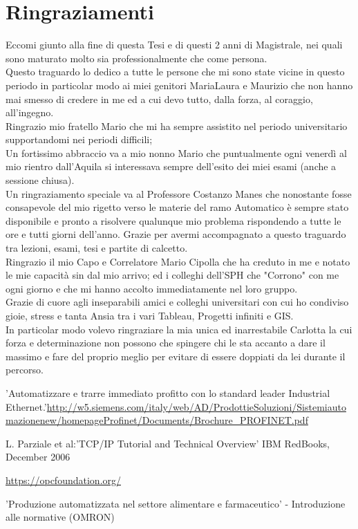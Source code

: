 \documentclass[12pt, a4paper, oneside]{book}
\begin{document}
\chapter*{Ringraziamenti}
Eccomi giunto alla fine di questa Tesi e di questi 2 anni di Magistrale, nei quali sono maturato molto sia professionalmente che come persona. 
\\Questo traguardo lo dedico a tutte le persone che mi sono state vicine in questo periodo in particolar modo ai miei genitori MariaLaura e Maurizio che non hanno mai smesso di credere in me ed a cui devo tutto, dalla forza, al coraggio, all'ingegno. 
\\Ringrazio mio fratello Mario che mi ha sempre assistito nel periodo universitario supportandomi nei periodi difficili; 
\\Un fortissimo abbraccio va a mio nonno Mario che puntualmente ogni venerdì al mio rientro dall'Aquila si interessava sempre dell'esito dei miei esami (anche a sessione chiusa).
\\Un ringraziamento speciale va al Professore Costanzo Manes che nonostante fosse consapevole del mio rigetto verso le materie del ramo Automatico è sempre stato disponibile e pronto a risolvere qualunque mio problema rispondendo a tutte le ore e tutti giorni dell'anno. Grazie per avermi accompagnato a questo traguardo tra lezioni, esami, tesi e partite di calcetto.
\\Ringrazio il mio Capo e Correlatore Mario Cipolla che ha creduto in me e notato le mie capacità sin dal mio arrivo; ed i colleghi dell'SPH che "Corrono" con me ogni giorno e che mi hanno accolto immediatamente nel loro gruppo. 
\\Grazie di cuore agli inseparabili amici e colleghi universitari con cui ho condiviso gioie, stress e tanta Ansia tra i vari Tableau, Progetti infiniti e GIS.
\\In particolar modo volevo ringraziare la mia unica ed inarrestabile Carlotta la cui forza e determinazione non possono che spingere chi le sta accanto a dare il massimo e fare del proprio meglio per evitare di essere doppiati da lei durante il percorso. 

\newpage
\begin{thebibliography}{100}
	'Automatizzare e trarre immediato profitto con lo standard leader Industrial Ethernet.'\url{http://w5.siemens.com/italy/web/AD/ProdottieSoluzioni/Sistemiautomazionenew/homepageProfinet/Documents/Brochure_PROFINET.pdf}	
	
	L. Parziale et al:'TCP/IP Tutorial and Technical Overview' IBM RedBooks, December 2006
	
	\url{https://opcfoundation.org/}
	
	'Produzione automatizzata nel settore alimentare e farmaceutico' - Introduzione alle normative (OMRON)
	
	

	
\end{thebibliography}
\end{document}
